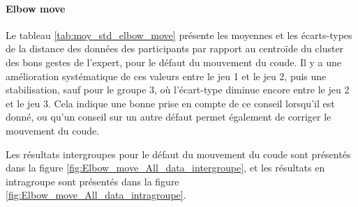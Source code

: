 \paragraph{Elbow move}

Le tableau \ref{tab:moy_std_elbow_move} présente les moyennes et les écarts-types de la distance des données des participants par rapport au centroïde du cluster des bons gestes de l'expert, pour le défaut du mouvement du coude. Il y a une amélioration systématique de ces valeurs entre le jeu 1 et le jeu 2, puis une stabilisation, sauf pour le groupe 3, où l'écart-type diminue encore entre le jeu 2 et le jeu 3. Cela indique une bonne prise en compte de ce conseil lorsqu'il est donné, ou qu'un conseil sur un autre défaut permet également de corriger le mouvement du coude.

\begin{table}[H]
\small
{}
\caption{Moyennes et écarts-types des données des apprenants (mouvement du coude).}
\label{tab:moy_std_elbow_move}
\end{table}

Les résultats intergroupes pour le défaut du mouvement du coude sont présentés dans la figure \ref{fig:Elbow_move_All_data_intergroupe}, et les résultats en intragroupe sont présentés dans la figure \ref{fig:Elbow_move_All_data_intragroupe}.


